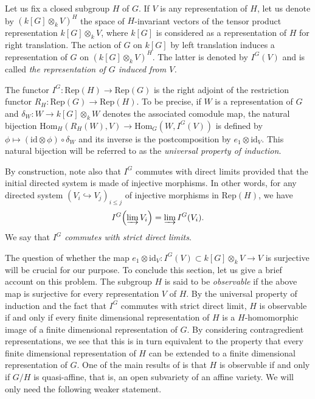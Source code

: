 \documentclass{amsart}
\theoremstyle{definition}
\begin{document}
Let us fix a closed subgroup $H$ of $G$. If $V$ is any representation of $H$, let us denote by $(k[G]\otimes_k V)^H$ the space of $H$-invariant vectors of the tensor product representation $k[G]\otimes_k V$, where $k[G]$ is considered as a representation of $H$ for right translation. The action of $G$ on $k[G]$ by left translation induces a representation of $G$ on $(k[G]\otimes_k V)^H$. The latter is denoted by $I^G(V)$ and is called \textit{the representation of $G$ induced from $V$.}

The functor $I^G : \mathrm{Rep}(H) \to \mathrm{Rep}(G)$ is the right adjoint of the restriction functor $R_H :\mathrm{Rep}(G) \to \mathrm{Rep}(H)$. To be precise, if $W$ is a representation of $G$ and $\delta_W : W \to k[G] \otimes_k W$ denotes the associated comodule map, the natural bijection $\mathrm{Hom}_H(R_H(W),V) \to \mathrm{Hom}_G(W, I^G(V))$ is defined by $\phi \mapsto (\mathrm{id} \otimes \phi)\circ \delta_W$ and its inverse is the postcomposition by $e_1 \otimes \mathrm{id}_V$. This natural bijection will be referred to as the \textit{universal property of induction}.

By construction, note also that $I^G$ commutes with direct limits provided that the initial directed system is made of injective morphisms. In other words, for any directed system $(V_i \hookrightarrow V_j)_{i\leq j}$ of injective morphisms in $\mathrm{Rep}(H)$, we have $$I^G\!\left(\varinjlim V_i\right) = \varinjlim I^G(V_i).$$
We say that \textit{$I^G$ commutes with strict direct limits}.

The question of whether the map $e_1 \otimes \mathrm{id}_V : I^G(V) \subset k[G] \otimes_k V \to V$ is surjective will be crucial for our purpose. To conclude this section, let us give a brief account on this problem. The subgroup $H$ is said to be \textit{observable} if the above map is surjective for every representation $V$ of $H$. By the universal property of induction and the fact that $I^G$ commutes with strict direct limit, $H$ is observable if and only if every finite dimensional representation of $H$ is a $H$-homomorphic image of a finite dimensional representation of $G$. By considering contragredient representations, we see that this is in turn equivalent to the property that every finite dimensional representation of $H$ can be extended to a finite dimensional representation of $G$. One of the main results of \cite{BBHM} is that $H$ is observable if and only if $G/H$ is quasi-affine, that is, an open subvariety of an affine variety. We will only need the following weaker statement.
\end{document}
